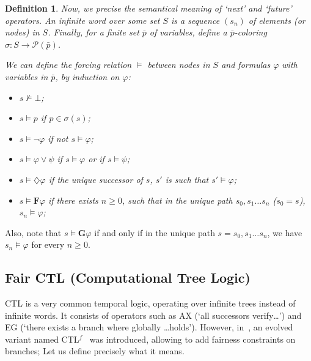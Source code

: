 \documentclass[11pt]{article}
\newcommand{\CTLf}{{CTL$^f$ }}
\newcommand{\F}{{\mathbf{F}}}
\newcommand{\phii}{{\varphi}}
\newcommand{\G}{{\mathbf{G}}}
\newcommand{\dia}{{\diamondsuit}}
\newtheorem*{definition}{Definition}
\begin{document}
\begin{definition}\label{infinite word}
    Now, we precise the semantical meaning of `next' and `future' operators.
    An \emph{infinite word} over some set $S$ is a sequence $(s_n)$ of 
    elements (or \emph{nodes}) in $S$. 
    Finally, for a finite set $\bar{p}$ of
    variables, define a \emph{$\bar{p}$-coloring} $\sigma : S \to \mathcal{P}(\bar{p})$.

    We can define the forcing relation $\models$ between nodes in $S$ and formulas $\phii$ with 
    variables in $\bar{p}$, by induction on $\phii$:
    \begin{itemize}
        \setlength\itemsep{0em}
        \item[-] $s\not\models \bot$;
        \item[-] $s \models p$ if $p \in \sigma(s)$;
        \item[-] $s \models \neg\phii$ if not $s \models \phii$;
        \item[-] $s \models \phii \vee \psi$ if $s\models \phii$ or if $s\models \psi$;
        \item[-] $s\models \dia\phii$ if the unique successor of $s$, $s'$ is such that
             $s'\models \phii$;
        \item[-] $s\models \F\phii$ if there exists $n\geq 0$, such that in the unique path 
            $s_0,s_1\ldots s_n$ ($s_0=s$), $s_n\models\phii$;      
    \end{itemize}

\end{definition}

Also, note that $s\models \G\phii$ if and only if in the unique path $s=s_0,s_1\ldots s_n$, we have
$s_n\models\phii$ for every $n\geq 0$.




\subsection{Fair CTL (Computational Tree Logic)}
CTL is a very common temporal logic, operating over infinite trees instead of infinite words.
It consists of operators such as AX (`all successors verify\ldots') and EG
(`there exists a branch where globally \ldots holds'). However, in~\cite{GhivG16}, an evolved variant named
\CTLf~was introduced, allowing to add fairness constraints on branches; Let us define precisely
what it means.
\end{document}

